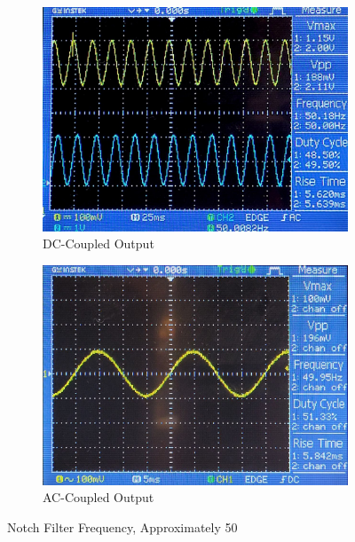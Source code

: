 \documentclass[hidelinks,12pt]{article}
\begin{document}
	\begin{figure}[!h]
		\centering
		\begin{subfigure}{0.45\textwidth}
			\centering
			\includegraphics[height=0.75\linewidth]{figures/results/50hz_output_dc}
			\caption{DC-Coupled Output}
		\end{subfigure}
		\hfill
		\begin{subfigure}{0.45\textwidth}
			\centering
			\includegraphics[height=0.75\linewidth]{figures/results/50hz_output_ac}
			\caption{AC-Coupled Output}
		\end{subfigure}
		\caption{Notch Filter Frequency, Approximately 50\,}
	\end{figure}
	
\end{document}
